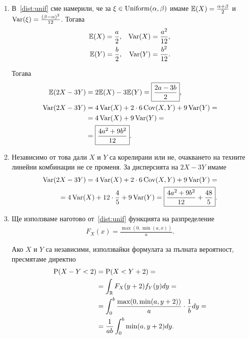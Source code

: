 \documentclass[numbers=endperiod, bibliography=totocnumbered]{scrartcl}
\begin{document}
\begin{solution}
  \mbox{}
  \begin{enumerate}[label=\alph*)]
    \item В~\ref{dist:unif} сме намерили, че за \( \xi \in \operatorname{Uniform}(\alpha, \beta) \) имаме \( \mathbb{E}(X) = \frac {\alpha + \beta} 2 \) и \( \operatorname{Var}(\xi) = \frac {{(\beta - \alpha)}^2} {12} \). Тогава
    \begin{align*}
      \mathbb{E}(X) = \frac a 2,
      &&
      \operatorname{Var}(X) = \frac {a^2} {12},
      \\
      \mathbb{E}(Y) = \frac b 2,
      &&
      \operatorname{Var}(Y) = \frac {b^2} {12}.
    \end{align*}

    Тогава
    \begin{align*}
      \mathbb{E}(2X - 3Y)
      &=
      2\mathbb{E}(X) - 3\mathbb{E}(Y)
      =
      \boxed{\frac {2a - 3b} 2},
      \\
      \operatorname{Var}(2X - 3Y)
      &=
      4\operatorname{Var}(X) + 2 \cdot 6 \operatorname{Cov}(X, Y) + 9\operatorname{Var}(Y)
      = \\ &=
      4\operatorname{Var}(X) + 9\operatorname{Var}(Y)
      = \\ &=
      \boxed{\frac {4a^2 + 9b^2} {12}}.
    \end{align*}

    \item Независимо от това дали \( X \) и \( Y \) са корелирани или не, очакването на техните линейни комбинации не се променя. За дисперсията на \( 2X - 3Y \) имаме
    \begin{align*}
      \operatorname{Var}(2X - 3Y)
      =
      4\operatorname{Var}(X) + 2 \cdot 6 \operatorname{Cov}(X, Y) + 9\operatorname{Var}(Y)
      = \\ =
      4\operatorname{Var}(X) + 12 \cdot \frac 4 5 + 9\operatorname{Var}(Y)
      =
      \boxed{\frac {4a^2 + 9b^2} {12} + \frac {48} 5}.
    \end{align*}

    \item Ще използваме наготово от~\ref{dist:unif} функцията на разпределение
    \begin{align*}
      F_X(x) = \frac {\max(0, \min(a, x))} a.
    \end{align*}

     Ако \( X \) и \( Y \) са независими, използвайки формулата за пълната вероятност, пресмятаме директно
    \begin{align*}
      \operatorname{P}(X - Y < 2)
      &=
      \operatorname{P}(X < Y + 2)
      = \\ &=
      \int_{\mathbb{R}} F_X(y+2) f_Y(y) dy
      = \\ &=
      \int_0^b \frac {\max(0, \min(a, y+2))} a \cdot \frac 1 b dy
      = \\ &=
      \frac 1 {ab} \int_0^b \min(a, y+2) dy.
    \end{align*}


\end{enumerate}
\end{solution}
\end{document}
